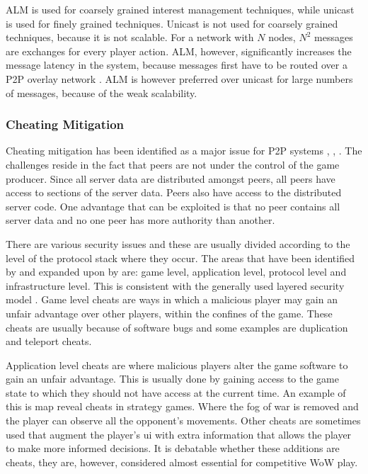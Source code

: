 \documentclass[journal,oneside,a4paper,onecolumn]{IEEEtran}
\begin{document}
ALM is used for coarsely grained interest management techniques, while unicast is used for finely grained techniques. Unicast is not used for coarsely grained techniques, because it is not scalable. For a network with $N$ nodes, $N^2$ messages are exchanges for every player action. ALM, however, significantly increases the message latency in the system, because messages first have to be routed over a P2P overlay network \cite{}. ALM is however preferred over unicast for large numbers of messages, because of the weak scalability.

\subsubsection{Cheating Mitigation}

Cheating mitigation has been identified as a major issue for P2P systems \cite{knutsson_p2p_first}, \cite{challenges_p2p_gaming}, \cite{cheat_proof_event_ordering}. The challenges reside in the fact that peers are not under the control of the game producer. Since all server data are distributed amongst peers, all peers have access to sections of the server data. Peers also have access to the distributed server code. One advantage that can be exploited is that no peer contains all server data and no one peer has more authority than another.

There are various security issues and these are usually divided according to the level of the protocol stack where they occur. The areas that have been identified by \cite{cheat_proof_event_ordering} and expanded upon by \cite{cheating_taxonomy} are: game level, application level, protocol level and infrastructure level. This is consistent with the generally used layered security model \cite{distributed_systems_security}. Game level cheats are ways in which a malicious player may gain an unfair advantage over other players, within the confines of the game. These cheats are usually because of software bugs and some examples are duplication and teleport cheats.

Application level cheats are where malicious players alter the game software to gain an unfair advantage. This is usually done by gaining access to the game state to which they should not have access at the current time. An example of this is map reveal cheats in strategy games. Where the fog of war is removed and the player can observe all the opponent's movements. Other cheats are sometimes used that augment the player's \ac{ui} with extra information that allows the player to make more informed decisions. It is debatable whether these additions are cheats, they are, however, considered almost essential for competitive \ac{WoW} play.
\end{document}
